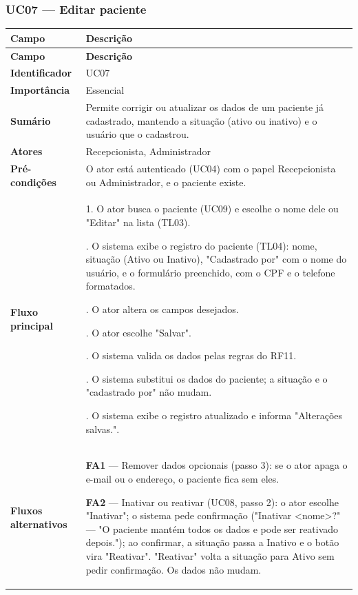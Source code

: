 \subsubsection{UC07 — Editar paciente}

{\small
\renewcommand{\arraystretch}{1.25}
\setlength{\tabcolsep}{8pt}
\begin{longtable}{|p{}|p{}|}
\hline
\textbf{Campo} & \textbf{Descrição} \\ \hline
\endfirsthead
\hline
\textbf{Campo} & \textbf{Descrição} \\ \hline
\endhead
\textbf{Identificador} & UC07 \\ \hline
\textbf{Importância} & Essencial \\ \hline
\textbf{Sumário} & Permite corrigir ou atualizar os dados de um paciente já cadastrado, mantendo a situação (ativo ou inativo) e o usuário que o cadastrou. \\ \hline
\textbf{Atores} & Recepcionista, Administrador \\ \hline
\textbf{Pré-condições} & O ator está autenticado (UC04) com o papel Recepcionista ou Administrador, e o paciente existe. \\ \hline
\textbf{Fluxo principal} & 1. O ator busca o paciente (UC09) e escolhe o nome dele ou "Editar" na lista (TL03).\par\smallskip
2. O sistema exibe o registro do paciente (TL04): nome, situação (Ativo ou Inativo), "Cadastrado por" com o nome do usuário, e o formulário preenchido, com o CPF e o telefone formatados.\par\smallskip
3. O ator altera os campos desejados.\par\smallskip
4. O ator escolhe "Salvar".\par\smallskip
5. O sistema valida os dados pelas regras do RF11.\par\smallskip
6. O sistema substitui os dados do paciente; a situação e o "cadastrado por" não mudam.\par\smallskip
7. O sistema exibe o registro atualizado e informa "Alterações salvas.". \\ \hline
\textbf{Fluxos alternativos} & \textbf{FA1} — Remover dados opcionais (passo 3): se o ator apaga o e-mail ou o endereço, o paciente fica sem eles.\par\smallskip
\textbf{FA2} — Inativar ou reativar (UC08, passo 2): o ator escolhe "Inativar"; o sistema pede confirmação ("Inativar <nome>?" — "O paciente mantém todos os dados e pode ser reativado depois."); ao confirmar, a situação passa a Inativo e o botão vira "Reativar". "Reativar" volta a situação para Ativo sem pedir confirmação. Os dados não mudam.\par\smallskip

\end{longtable}}
